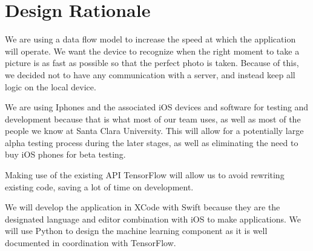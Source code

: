 \chapter{Design Rationale}

We are using a data flow model to increase the speed at which the application will operate.  We want the device to recognize when the right moment to take a picture is as fast as possible so that the perfect photo is taken.  Because of this, we decided not to have any communication with a server, and instead keep all logic on the local device.

We are using Iphones and the associated iOS devices and software for testing and development because that is what most of our team uses, as well as most of the people we know at Santa Clara University.  This will allow for a potentially large alpha testing process during the later stages, as well as eliminating the need to buy iOS phones for beta testing.

Making use of the existing API TensorFlow will allow us to avoid rewriting existing code, saving a lot of time on development.

We will develop the application in XCode with Swift because they are the designated language and editor combination with iOS to make applications.  We will use Python to design the machine learning component as it is well documented in coordination with TensorFlow.